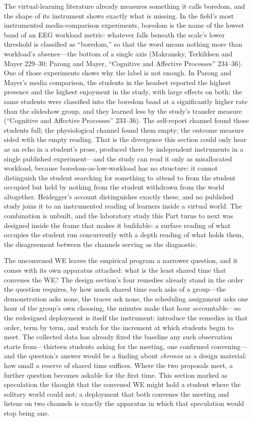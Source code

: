 The virtual-learning literature already measures something it calls
boredom, and the shape of its instrument shows exactly what is
missing. In the field's most instrumented media-comparison
experiments, boredom is the name of the lowest band of an EEG workload
metric: whatever falls beneath the scale's lower threshold is
classified as ``boredom,'' so that the word means nothing more than
workload's absence---the bottom of a single axis (Makransky,
Terkildsen and Mayer 229--30; Parong and Mayer, ``Cognitive and
Affective Processes'' 234--36). One of those experiments shows why the
label is not enough. In Parong and Mayer's media comparison, the
students in the headset reported the highest presence and the highest
enjoyment in the study, with large effects on both; the same students
were classified into the boredom band at a significantly higher rate
than the slideshow group, and they learned less by the study's
transfer measure (``Cognitive and Affective Processes'' 233--36). The
self-report channel found those students full; the physiological
channel found them empty; the outcome measure sided with the empty
reading. That is the divergence this section could only hear as an
echo in a student's prose, produced there by independent instruments
in a single published experiment---and the study can read it only as
misallocated workload, because boredom-as-low-workload has no
structure: it cannot distinguish the student searching for something
to attend to from the student occupied but held by nothing from the
student withdrawn from the world altogether. Heidegger's account
distinguishes exactly these, and no published study joins it to an
instrumented reading of learners inside a virtual world. The
combination is unbuilt, and the laboratory study this Part turns to
next was designed inside the frame that makes it buildable: a surface
reading of what occupies the student run concurrently with a depth
reading of what holds them, the disagreement between the channels
serving as the diagnostic.

The unconvened WE leaves the empirical program a narrower question,
and it comes with its own apparatus attached: what is the least shared
time that convenes the WE? The design section's four remedies already
stand in the order the question requires, by how much shared time each
asks of a group---the demonstration asks none, the traces ask none,
the scheduling assignment asks one hour of the group's own choosing,
the minutes make that hour accountable---so the redesigned deployment
is itself the instrument: introduce the remedies in that order, term
by term, and watch for the increment at which students begin to meet.
The collected data has already fixed the baseline any such observation
starts from---thirteen students asking for the meeting, one confirmed
convening---and the question's answer would be a finding about
\textit{chronos} as a design material: how small a reserve of shared
time suffices. Where the two proposals meet, a further question
becomes askable for the first time. This section marked as speculation
the thought that the convened WE might hold a student where the
solitary world could not; a deployment that both convenes the meeting
and listens on two channels is exactly the apparatus in which that
speculation would stop being one.

